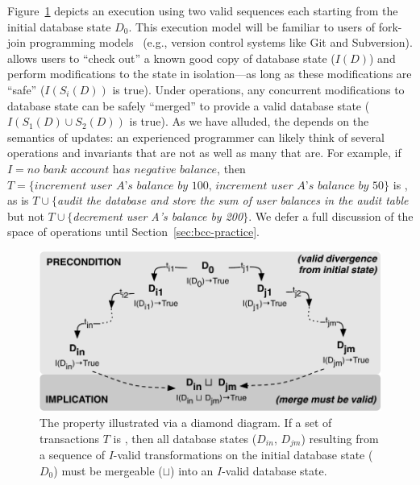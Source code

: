 Figure~\ref{fig:iconfluence} depicts an \iconfluent execution using
two valid sequences each starting from the initial database state
$D_0$. This execution model will be familiar to users of fork-join
programming models~\cite{hewitt-forkjoin} (e.g., version control
systems like Git and Subversion). \iconfluence allows users to ``check
out'' a known good copy of database state ($I(D)$) and perform
modifications to the state in isolation---as long as these
modifications are ``safe'' ($I(S_i(D))$ is true). Under \iconfluent
operations, any concurrent modifications to database state can be
safely ``merged'' to provide a valid database state ($I(S_1(D) \cup
S_2(D))$ is true). As we have alluded, the \iconfluence depends on the
semantics of updates: an experienced programmer can likely think of
several operations and invariants that are not \iconfluent as well as
many that are. For example, if $I=\textit{no bank account has negative
  balance}$, then $T=\{\textit{increment user A's balance by 100,
  increment user A's balance by 50}\}$ is \iconfluent, as is
$T\cup\{$\textit{audit the database and store the sum of user balances
  in the \textrm{audit} table} but not $T\cup\{$\textit{decrement user
  A's balance by 200}$\}$. We defer a full discussion of the space of
operations until Section~\ref{sec:bcc-practice}.

\begin{figure}
\begin{center}
\includegraphics[width=\columnwidth]{figs/icommute.pdf}
\end{center}
\caption{The \iconfluence property illustrated via a diamond
  diagram. If a set of transactions $T$ is \iconfluent, then all
  database states ($D_{in}$, $D_{jm}$) resulting from a sequence of
  $I$-valid transformations on the initial database state ($D_0$) must
  be mergeable ($\sqcup$) into an $I$-valid database state.}
\label{fig:iconfluence}
\end{figure}

